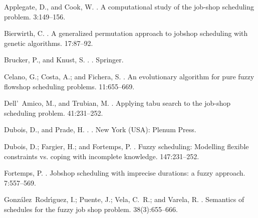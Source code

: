 \documentclass[letterpaper]{article}
\begin{document}
%
%

\begin{thebibliography}{}

Applegate, D., and Cook, W.
.
\newblock A computational study of the job-shop scheduling problem.
 3:149--156.

Bierwirth, C.
.
\newblock A generalized permutation approach to jobshop scheduling with genetic
  algorithms.
 17:87--92.

Brucker, P., and Knust, S.
.
.
\newblock Springer.

Celano, G.; Costa, A.; and Fichera, S.
.
\newblock An evolutionary algorithm for pure fuzzy flowshop scheduling
  problems.
 11:655--669.

Dell'~Amico, M., and Trubian, M.
.
\newblock Applying tabu search to the job-shop scheduling problem.
 41:231--252.

Dubois, D., and Prade, H.
.
.
\newblock New York (USA): Plenum Press.

Dubois, D.; Fargier, H.; and Fortemps, P.
.
\newblock Fuzzy scheduling: Modelling flexible constraints vs. coping with
  incomplete knowledge.
 147:231--252.

Fortemps, P.
.
\newblock Jobshop scheduling with imprecise durations: a fuzzy approach.
 7:557--569.

Gonz\'alez~Rodr\'{\i}guez, I.; Puente, J.; Vela, C.~R.; and Varela, R.
.
\newblock Semantics of schedules for the fuzzy job shop problem.
  38(3):655--666.


\end{thebibliography}
\end{document}
